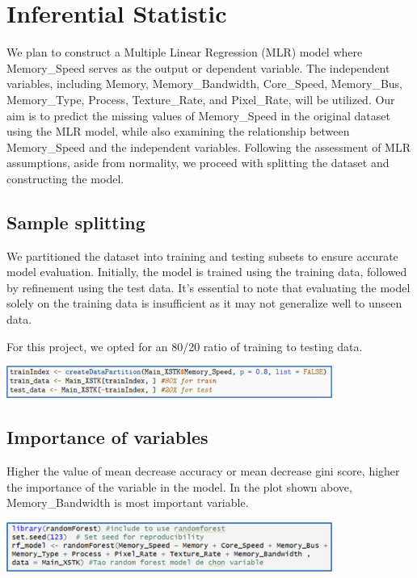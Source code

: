 \section{Inferential Statistic}
\tab We plan to construct a Multiple Linear Regression (MLR) model where Memory\_Speed serves as the output or dependent variable. The independent variables, including Memory, Memory\_Bandwidth, Core\_Speed, Memory\_Bus, Memory\_Type, Process, Texture\_Rate, and Pixel\_Rate, will be utilized. Our aim is to predict the missing values of Memory\_Speed in the original dataset using the MLR model, while also examining the relationship between Memory\_Speed and the independent variables. Following the assessment of MLR assumptions, aside from normality, we proceed with splitting the dataset and constructing the model.

\subsection{Sample splitting}
\tab We partitioned the dataset into training and testing subsets to ensure accurate model evaluation. Initially, the model is trained using the training data, followed by refinement using the test data. It's essential to note that evaluating the model solely on the training data is insufficient as it may not generalize well to unseen data.  

\tab For this project, we opted for an 80/20 ratio of training to testing data. 

\begin{center}
    \includegraphics[width=0.8\textwidth]{Sample-splitting.png}
\end{center}

\subsection{Importance of variables}
\tab Higher the value of mean decrease accuracy or mean decrease gini score, higher the importance of the variable in the model. In the plot shown above, Memory\_Bandwidth is most important variable. 

\begin{center}
    \includegraphics[width=0.8\textwidth]{importance.png}
\end{center}

